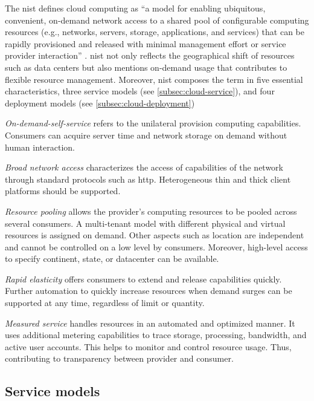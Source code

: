 The \ac{nist} defines cloud computing as \enquote{a model for enabling ubiquitous, convenient, on-demand network access to a shared pool of configurable computing resources (e.g., networks, servers, storage, applications, and services) that can be rapidly provisioned and released with minimal management effort or service provider interaction} \cite{Mell2011}.
\ac{nist} not only reflects the geographical shift of resources such as data centers but also mentions on-demand usage that contributes to flexible resource management.
Moreover, \ac{nist} composes the term in five essential characteristics, three service models (see \autoref{subsec:cloud-service}), and four deployment models (see \autoref{subsec:cloud-deployment}) \cite{Mell2011}

\textit{On-demand-self-service} refers to the unilateral provision computing capabilities.
Consumers can acquire server time and network storage on demand without human interaction.

\textit{Broad network access} characterizes the access of capabilities of the network through standard protocols such as \acs{http}.
Heterogeneous thin and thick client platforms should be supported.

\textit{Resource pooling} allows the provider's computing resources to be pooled across several consumers.
A multi-tenant model with different physical and virtual resources is assigned on demand.
Other aspects such as location are independent and cannot be controlled on a low level by consumers.
Moreover, high-level access to specify continent, state, or datacenter can be available.

\textit{Rapid elasticity} offers consumers to extend and release capabilities quickly.
Further automation to quickly increase resources when demand surges can be supported at any time, regardless of limit or quantity.

\textit{Measured service} handles resources in an automated and optimized manner.
It uses additional metering capabilities to trace storage, processing, bandwidth, and active user accounts.
This helps to monitor and control resource usage. Thus, contributing to transparency between provider and consumer.

\subsection{Service models}
\label{subsec:cloud-service}

